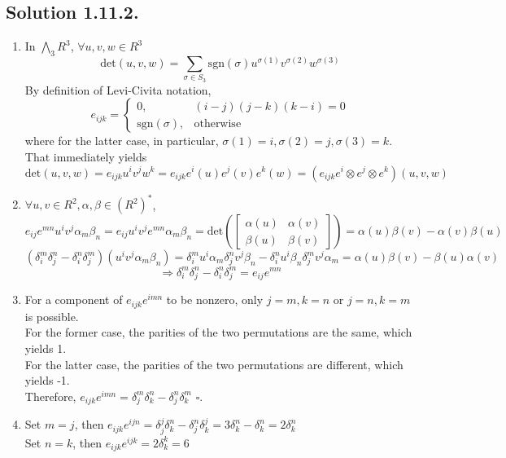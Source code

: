 \documentclass{article}
\begin{document}
\subsection*{Solution 1.11.2.}
\begin{enumerate}
    \item In $\bigwedge_3 R^3$, $\forall u,v,w \in R^3$
    \[\mathrm{det}(u,v,w) = \sum _{\sigma \in S_3} \mathrm{sgn}(\sigma) u ^ {\sigma(1)} v ^ {\sigma(2)} w ^ {\sigma(3)}\]
    By definition of Levi-Civita notation, 
    \[e_{ijk} = \left\{\begin{array}{ll}
    0, & (i-j)(j-k)(k-i) = 0 \\
    \mathrm{sgn}(\sigma), & \text{otherwise}
    \end{array}\right.\]
    where for the latter case, in particular, $\sigma(1) = i, \sigma(2) = j, \sigma(3) = k$. That immediately yields
    \[\mathrm{det}(u,v,w) = e_{ijk} u^i v^j w^k = e_{ijk} e^i(u)e^j(v)e^k(w) = (e_{ijk} e^i \otimes e^j \otimes e^k)(u,v,w)\]
    \item $\forall u,v\in R^2, \alpha, \beta \in (R^2)^*$,
    \[e_{ij} e^{mn}u^i v^j \alpha_m \beta_n = e_{ij} u^iv^je^{mn} \alpha_m \beta_n = \mathrm{det}\left(\left[\begin{array}{cc}
    \alpha(u) & \alpha(v) \\
    \beta(u) & \beta(v)
    \end{array}\right]\right) = \alpha(u)\beta(v) - \alpha(v)\beta(u)\]
    \[(\delta_i^m\delta_j^n-\delta_i^n\delta_j^m)(u^iv^j\alpha_m\beta_n) = \delta_i^m u^i \alpha_m \delta_j^n v^j \beta_n -\delta_i^n u^i \beta_n \delta_j^m v^j \alpha_m = \alpha(u)\beta(v) - \beta(u)\alpha(v)\]
    \[\Rightarrow \delta_i^m\delta_j^n-\delta_i^n\delta_j^m = e_{ij} e^{mn}\]
    \item
    For a component of $e_{ijk} e^{imn}$ to be nonzero, only $j=m, k = n$ or $j = n, k = m$ is possible. \\
    For the former case, the parities of the two permutations are the same, which yields 1. \\
    For the latter case, the parities of the two permutations are different, which yields -1. \\
    Therefore, $e_{ijk} e^{imn} = \delta_j ^ m \delta_k^ n -\delta_j ^ n\delta _k ^m$     $\square$.
    \item Set $m=j$, then $e_{ijk} e^{ijn} = \delta_j ^ j \delta_k^ n -\delta_j ^ n\delta _k ^j = 3\delta_k^ n - \delta_k ^n = 2\delta_k^n$ \\
    Set $n = k$, then $e_{ijk} e^{ijk} = 2\delta_k^k = 6$
\end{enumerate}
\end{document}
